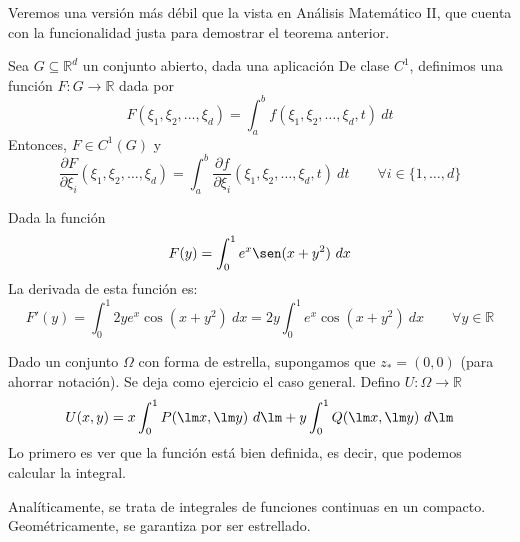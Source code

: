 
Veremos una versión más débil que la vista en Análisis Matemático II, que cuenta con la funcionalidad justa para demostrar el teorema anterior.
\begin{teo}
Sea $G\subseteq \mathbb{R}^d$ un conjunto abierto, dada una aplicación
De clase $C^1$, definimos una función $F:G\rightarrow\mathbb{R}$ dada por
\begin{equation*}
    F(\xi_1, \xi_2, \ldots, \xi_d) = \int_{a}^{b} f(\xi_1, \xi_2, \ldots, \xi_d, t)~dt
\end{equation*}
Entonces, $F\in C^1(G)$ y 
\begin{equation*}
    \dfrac{\partial F}{\partial \xi_i}(\xi_1, \xi_2, \ldots, \xi_d) = \int_{a}^{b} \dfrac{\partial f}{\partial \xi_i}(\xi_1, \xi_2, \ldots, \xi_d, t)~dt \qquad \forall i \in \{1,\ldots, d\}
\end{equation*}
\end{teo}

\begin{ejemplo}
    Dada la función
    \begin{equation*}
        F(y) = \int_{0}^{1} e^x \sen(x+y^2)~dx 
    \end{equation*}
    La derivada de esta función es:
    \begin{equation*}
        F'(y) = \int_{0}^{1} 2ye^x \cos(x+y^2)~dx = 2y\int_{0}^{1} e^x \cos(x+y^2)~dx \qquad \forall y\in \mathbb{R}
    \end{equation*}
\end{ejemplo}


Dado un conjunto $\Omega$ con forma de estrella, supongamos que $z_\ast = (0,0)$ (para ahorrar notación). Se deja como ejercicio el caso general.
Defino $U:\Omega\rightarrow\mathbb{R}$
\begin{equation*}
    U(x,y) = x\int_{0}^{1} P(\lm x,\lm y)~d\lm + y\int_{0}^{1} Q(\lm x, \lm y)~d\lm  
\end{equation*}
Lo primero es ver que la función está bien definida, es decir, que podemos calcular la integral.

Analíticamente, se trata de integrales de funciones continuas en un compacto.
Geométricamente, se garantiza por ser estrellado.

